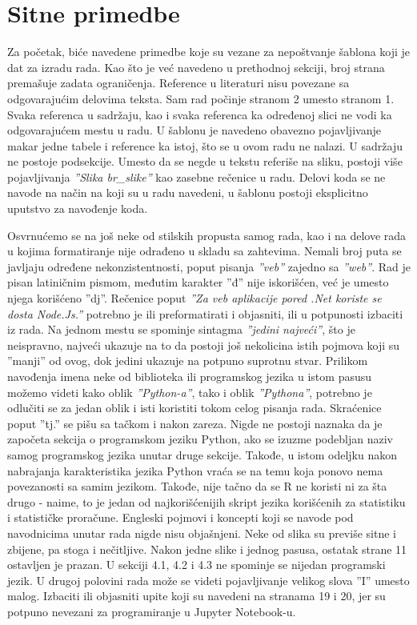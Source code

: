 \documentclass[a4paper]{report}
\begin{document}
\section{Sitne primedbe}
\label{sec:sitno}
Za početak, biće navedene primedbe koje su vezane za nepoštvanje šablona koji je dat za izradu rada. Kao što je već navedeno u prethodnoj sekciji, broj strana premašuje zadata ograničenja. Reference u literaturi nisu povezane sa odgovarajućim delovima teksta. Sam rad počinje stranom 2 umesto stranom 1. Svaka referenca u sadržaju, kao i svaka referenca ka određenoj slici ne vodi ka odgovarajućem mestu u radu. U šablonu je navedeno obavezno pojavljivanje makar jedne tabele i reference ka istoj, što se u ovom radu ne nalazi. U sadržaju ne postoje podsekcije. Umesto da se negde u tekstu referiše na sliku, postoji više pojavljivanja \textit{''Slika br\_slike''} kao zasebne rečenice u radu. Delovi koda se ne navode na način na koji su u radu navedeni, u šablonu postoji eksplicitno uputstvo za navođenje koda. \par Osvrnućemo se na još neke od stilskih propusta samog rada, kao i na delove rada u kojima formatiranje nije odrađeno u skladu sa zahtevima. Nemali broj puta se javljaju određene nekonzistentnosti, poput pisanja \textit{''veb''} zajedno sa \textit{''web''}. Rad je pisan latiničnim pismom, međutim karakter ''đ'' nije iskorišćen, već je umesto njega korišćeno ''dj''. Rečenice poput \textit{''Za veb aplikacije pored .Net koriste se dosta Node.Js.''} potrebno je ili preformatirati i objasniti, ili u potpunosti izbaciti iz rada. Na jednom mestu se spominje sintagma \textit{''jedini najveći''}, što je neispravno, najveći ukazuje na to da postoji još nekolicina istih pojmova koji su ''manji'' od ovog, dok jedini ukazuje na potpuno suprotnu stvar. Prilikom navođenja imena neke od biblioteka ili programskog jezika u istom pasusu možemo videti kako oblik \textit{''Python-a''}, tako i oblik \textit{''Pythona''}, potrebno je odlučiti se za jedan oblik i isti koristiti tokom celog pisanja rada. Skraćenice poput ''tj.'' se pišu sa tačkom i nakon zareza. Nigde ne postoji naznaka da je započeta sekcija o programskom jeziku Python, ako se izuzme podebljan naziv samog programskog jezika unutar druge sekcije. Takođe, u istom odeljku nakon nabrajanja karakteristika jezika Python vraća se na temu koja ponovo nema povezanosti sa samim jezikom. Takođe, nije tačno da se R ne koristi ni za šta drugo - naime, to je jedan od najkorišćenijih skript jezika korišćenih za statistiku i statističke proračune. Engleski pojmovi i koncepti koji se navode pod navodnicima unutar rada nigde nisu objašnjeni. Neke od slika su previše sitne i zbijene, pa stoga i nečitljive. Nakon jedne slike i jednog pasusa, ostatak strane 11 ostavljen je prazan. U sekciji 4.1, 4.2 i 4.3 ne spominje se nijedan programski jezik. U drugoj polovini rada može se videti pojavljivanje velikog slova ''I'' umesto malog. Izbaciti ili objasniti upite koji su navedeni na stranama 19 i 20, jer su potpuno nevezani za programiranje u Jupyter Notebook-u.
\end{document}
